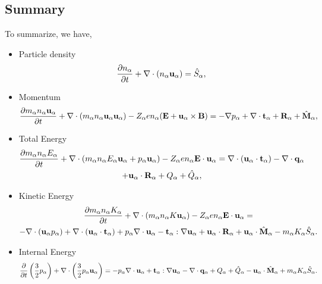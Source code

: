 \documentclass[oneside,a4paper,11pt]{report}
\begin{document}
\subsection{Summary}
To summarize, we have,
\begin{itemize}
    \item Particle density
\begin{equation}
\label{eq:cons_mass}
    \frac{\partial n_\alpha}{\partial t} + \nabla \cdot \left ( n_\alpha \mathbf{u}_\alpha \right ) = \hat{S}_\alpha,
\end{equation}

    \item Momentum
\begin{equation}
\label{eq:cons_mom}
    \frac{\partial m_\alpha n_\alpha \mathbf{u}_\alpha}{\partial t} + \nabla \cdot \left ( m_\alpha n_\alpha \mathbf{u}_\alpha \mathbf{u}_\alpha \right) - Z_\alpha e n_\alpha ( \mathbf{E} + \mathbf{u}_\alpha \times \mathbf{B} ) = - \nabla p_\alpha + \nabla \cdot \mathbf{t}_\alpha + \mathbf{R}_\alpha + \hat{\mathbf{M}}_\alpha,
\end{equation}

    \item Total Energy
\begin{multline}
\label{eq:cons_te}
\frac{\partial m_\alpha n_\alpha E_\alpha}{\partial t} + \nabla \cdot (m_\alpha n_\alpha E_\alpha \mathbf{u}_\alpha + p_\alpha \mathbf{u}_\alpha ) - Z_\alpha e n_\alpha \mathbf{E} \cdot \mathbf{u}_\alpha = \nabla \cdot ( \mathbf{u}_\alpha \cdot \mathbf{t}_\alpha ) - \nabla \cdot \mathbf{q}_\alpha \\
+ \mathbf{u}_\alpha \cdot \mathbf{R}_\alpha + Q_{\alpha} + \hat{Q}_\alpha, 
\end{multline}
    
    \item Kinetic Energy
\begin{multline}
\label{eq:cons_ke}
\frac{\partial m_\alpha n_\alpha K_\alpha}{\partial t} + \nabla \cdot ( m_\alpha n_\alpha K \mathbf{u}_\alpha ) - Z_\alpha e n_\alpha \mathbf{E} \cdot \mathbf{u}_\alpha =\\
-\nabla \cdot ( \mathbf{u}_\alpha p_\alpha ) + \nabla \cdot (\mathbf{u}_\alpha \cdot \mathbf{t}_\alpha ) + p_\alpha \nabla \cdot \mathbf{u}_\alpha - \mathbf{t}_\alpha : \nabla \mathbf{u}_\alpha + \mathbf{u}_\alpha \cdot \mathbf{R}_\alpha + \mathbf{u}_\alpha \cdot \hat{\mathbf{M}}_\alpha - m_\alpha K_\alpha \hat{S}_\alpha .
\end{multline}    
    
    \item Internal Energy
\begin{equation}
\label{eq:cons_ie}
    \frac{\partial}{\partial t} \left ( \frac{3}{2} p_\alpha \right ) + \nabla \cdot \left ( \frac{3}{2} p_\alpha \mathbf{u}_\alpha \right ) = -p_\alpha \nabla \cdot \mathbf{u}_\alpha + \mathbf{t}_\alpha : \nabla \mathbf{u}_\alpha - \nabla \cdot \mathbf{q}_\alpha + Q_{\alpha} + \hat{Q}_\alpha - \mathbf{u}_\alpha \cdot \hat{\mathbf{M}}_\alpha + m_\alpha K_\alpha \hat{S}_\alpha .  
\end{equation}

\end{itemize}
\end{document}
